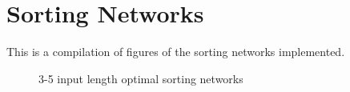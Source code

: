 \section{Sorting Networks}
This is a compilation of figures of the sorting networks implemented.
\begin{figure}[htb]
 \centering
    \begin{subfigure}[b]{0.3\textwidth}
        \centering
        \begin{sortingnetwork}{3}{0.4}
            \addtocounter{sncolumncounter}{2}
            \addtocounter{sncolumncounter}{2}
        \end{sortingnetwork}
    \end{subfigure}
    \begin{subfigure}[b]{0.3\textwidth}
        \centering
        \begin{sortingnetwork}{4}{0.4}
            \addtocounter{sncolumncounter}{2}
            \addtocounter{sncolumncounter}{2}
        \end{sortingnetwork}
    \end{subfigure}
    \begin{subfigure}[b]{0.33\textwidth}
        \centering
        \begin{sortingnetwork}{5}{0.4}
            \addtocounter{sncolumncounter}{2}
            \addtocounter{sncolumncounter}{2}
            \addtocounter{sncolumncounter}{2}
            \addtocounter{sncolumncounter}{2}
        \end{sortingnetwork}
    \end{subfigure}
 \caption{3-5 input length optimal sorting networks \cite{ron-zeno}}
 \label{fig:sort-5}
\end{figure}



